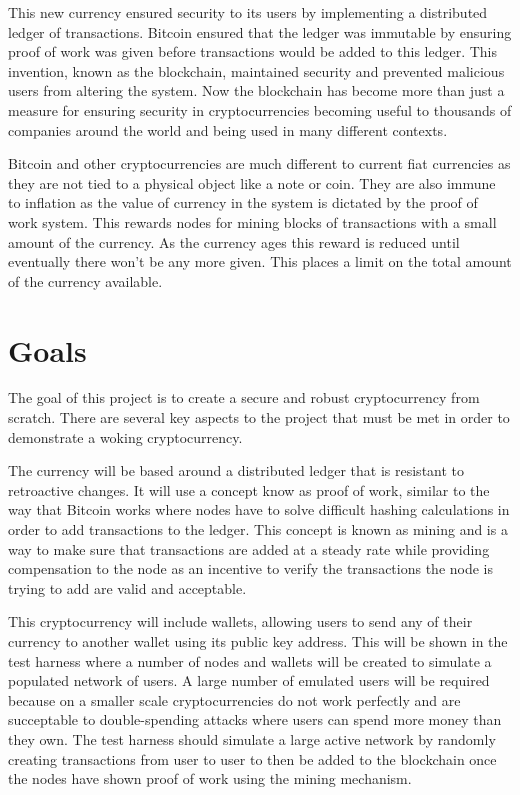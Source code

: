 \documentclass{l4proj}
\begin{document}
This new currency ensured security to its users by implementing a distributed ledger of transactions. Bitcoin
ensured that the ledger was immutable by ensuring proof of work was given before transactions would be
added to this ledger. This invention, known as the blockchain, maintained security and prevented malicious
users from altering the system. Now the blockchain has become more than just a measure for ensuring security
in cryptocurrencies becoming useful to thousands of companies around the world and being used
in many different contexts.

Bitcoin and other cryptocurrencies are much different to current fiat currencies as they are not tied to a physical
object like a note or coin. They are also immune to inflation as the value of currency in the system is dictated
by the proof of work system. This rewards nodes for mining blocks of transactions with a small amount of the 
currency. As the currency ages this reward is reduced until eventually there won't be any more given. This places
a limit on the total amount of the currency available. 

\section{Goals}
The goal of this project is to create a secure and robust cryptocurrency from scratch. There are several key aspects
to the project that must be met in order to demonstrate a woking cryptocurrency.

The currency will be based around
a distributed ledger that is resistant to retroactive changes. It will use a concept know as proof of work,
similar to the way that Bitcoin works where nodes have to solve difficult hashing calculations in order
to add transactions to the ledger. This concept is known as mining and is a way to make sure that transactions
are added at a steady rate while providing compensation to the node as an incentive to verify the transactions the node
is trying to add are valid and acceptable.

This cryptocurrency will include wallets, allowing users to send any of their currency to another
wallet using its public key address. This will be shown in the test harness where a number of nodes and wallets 
will be created to simulate a populated network of users. A large number of emulated users will be required because on
a smaller scale cryptocurrencies do not work perfectly and are succeptable to double-spending attacks where users
can spend more money than they own. The test harness should simulate a large active network by randomly creating
transactions from user to user to then be added to the blockchain once the nodes have shown proof of work using 
the mining mechanism.
\end{document}
